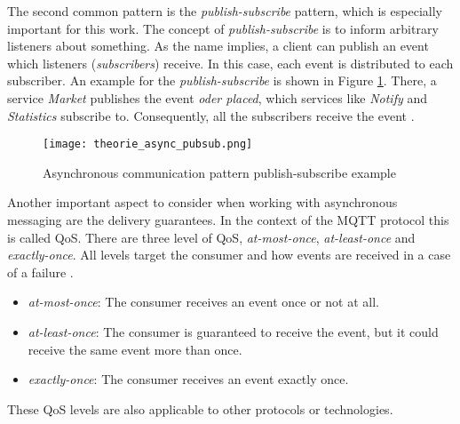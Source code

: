 The second common pattern is the \textit{publish-subscribe} pattern, which is especially important for this work.
The concept of \textit{publish-subscribe} is to inform arbitrary listeners about something.
As the name implies, a client can publish an event which listeners (\textit{subscribers}) receive.
In this case, each event is distributed to each subscriber.
An example for the \textit{publish-subscribe} is shown in Figure \ref{img:asyncPubSub}.
There, a service \textit{Market} publishes the event \textit{oder placed}, which services like \textit{Notify} and \textit{Statistics} subscribe to.
Consequently, all the subscribers receive the event \cite[p.~64f.]{Bruce.2019}.

\begin{figure}
	\centering
	\texttt{[image: theorie\_async\_pubsub.png]}
	\caption{Asynchronous communication pattern publish-subscribe example \cite[p.~64]{Bruce.2019}}
	\label{img:asyncPubSub}
\end{figure}

Another important aspect to consider when working with asynchronous messaging are the delivery guarantees.
In the context of the \acf{MQTT} protocol this is called \acf{QoS}.
There are three level of \ac{QoS}, \textit{at-most-once}, \textit{at-least-once} and \textit{exactly-once}.
All levels target the consumer and how events are received in a case of a failure \cite[p.~59f.]{Aziz.08.09.201412.09.2014}\cite{AndrewBanks.2014}.
\begin{itemize}
	\item \textit{at-most-once}: The consumer receives an event once or not at all.
	\item \textit{at-least-once}: The consumer is guaranteed to receive the event, but it could receive the same event more than once.
	\item \textit{exactly-once}: The consumer receives an event exactly once.
\end{itemize}

These \ac{QoS} levels are also applicable to other protocols or technologies.